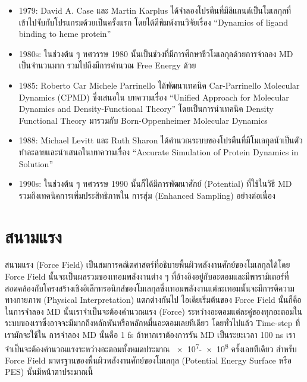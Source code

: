 \begin{itemize}[topsep=0pt,noitemsep]
    \item 1979: David A. Case และ Martin Karplus ได้จำลองโปรตีนที่มีลิแกนด์เป็นโมเลกุลที่เข้าไปจับกับโปรแกรมด้วยเป็นครั้งแรก
          โดยได้ตีพิมพ์งานวิจัยเรื่อง \enquote{Dynamics of ligand binding to heme protein}\autocite{case1979}

    \item 1980s: ในช่วงต้น ๆ ทศวรรษ 1980 นั้นเป็นช่วงที่มีการศึกษาชีวโมเลกุลด้วยการจำลอง MD เป็นจำนวนมาก รวมไปถึงมีการคำนวณ
          Free Energy ด้วย

    \item 1985: Roberto Car Michele Parrinello ได้พัฒนาเทคนิค Car-Parrinello Molecular Dynamics (CPMD) ซึ่งเสนอใน%
          บทความเรื่อง \enquote{Unified Approach for Molecular Dynamics and Density-Functional Theory}\autocite{car1985}
          โดยเป็นการนำเทคนิค Density Functional Theory มารวมกับ Born-Oppenheimer Molecular Dynamics

    \item 1988: Michael Levitt และ Ruth Sharon ได้คำนวณระบบของโปรตีนที่มีโมเลกุลน้ำเป็นตัวทำละลายและนำเสนอในบทความเรื่อง
          \enquote{Accurate Simulation of Protein Dynamics in Solution}\autocite{levitt1988}

    \item 1990s: ในช่วงต้น ๆ ทศวรรษ 1990 นั้นก็ได้มีการพัฒนาศักย์ (Potential) ที่ใช้ในวิธี MD รวมถึงเทคนิคการเพิ่มประสิทธิภาพใน%
          การสุ่ม (Enhanced Sampling) อย่างต่อเนื่อง
\end{itemize}

\section{สนามแรง}

สนามแรง (Force Field) เป็นสมการคณิตศาสตร์ที่อธิบายพื้นผิวพลังงานศักย์ของโมเลกุลได้โดย Force Field นั้นจะเป็นผลรวมของเทอมพลังงานต่าง ๆ
ที่อ้างอิงอยู่กับอะตอมและมีพารามิเตอร์ที่สอดคล้องกับโครงสร้างเชิงอิเล็กทรอนิกส์ของโมเลกุลซึ่งเทอมพลังงานแต่ละเทอมนั้นจะมีการตีความทางกายภาพ
(Physical Interpretation) แตกต่างกันไป ไอเดียเริ่มต้นของ Force Field นั้นก็คือในการจำลอง MD นั้นเราจำเป็นจะต้องคำนวณแรง (Force)
ระหว่างอะตอมแต่ละคู่ของทุกอะตอมในระบบของเราซึ่งอาจจะมีมากถึงหลักพันหรือหลักหมื่นอะตอมเลยทีเดียว โดยทั่วไปแล้ว Time-step ที่เรามักจะใช้ใน%
การจำลอง MD นั้นคือ 1 fs ถ้าหากเราต้องการรัน MD เป็นระยะเวลา 100 ns เราจำเป็นจะต้องคำนวณแรงระหว่างอะตอมทั้งหมดประมาณ
\num{e7}-\num{e8} ครั้งเลยทีเดียว สำหรับ Force Field มาตรฐานของพื้นผิวพลังงานศักย์ของโมเลกุล (Potential Energy Surface หรือ
PES) นั้นมีหน้าตาประมาณนี้

